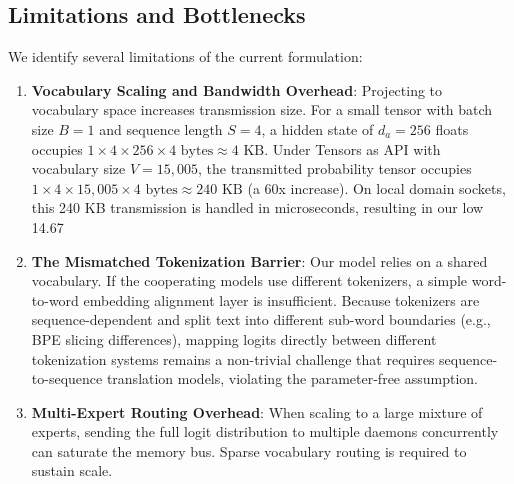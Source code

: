 \documentclass{article}
\begin{document}
\subsection{Limitations and Bottlenecks}
We identify several limitations of the current formulation:
\begin{enumerate}
	\item \textbf{Vocabulary Scaling and Bandwidth Overhead}: Projecting to vocabulary space increases transmission size. For a small tensor with batch size $B=1$ and sequence length $S=4$, a hidden state of $d_a=256$ floats occupies $1 \times 4 \times 256 \times 4\text{ bytes} \approx 4\text{ KB}$. Under Tensors as API with vocabulary size $V=15,005$, the transmitted probability tensor occupies $1 \times 4 \times 15,005 \times 4\text{ bytes} \approx 240\text{ KB}$ (a 60x increase). On local domain sockets, this 240 KB transmission is handled in microseconds, resulting in our low 14.67%
	\item \textbf{The Mismatched Tokenization Barrier}: Our model relies on a shared vocabulary. If the cooperating models use different tokenizers, a simple word-to-word embedding alignment layer is insufficient. Because tokenizers are sequence-dependent and split text into different sub-word boundaries (e.g., BPE slicing differences), mapping logits directly between different tokenization systems remains a non-trivial challenge that requires sequence-to-sequence translation models, violating the parameter-free assumption.
	\item \textbf{Multi-Expert Routing Overhead}: When scaling to a large mixture of experts, sending the full logit distribution to multiple daemons concurrently can saturate the memory bus. Sparse vocabulary routing is required to sustain scale.
\end{enumerate}
\end{document}
